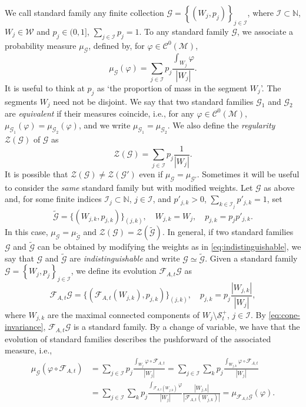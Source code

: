 \documentclass{amsart}
\numberwithin{equation}{section}
\newcommand\vf{\varphi}
\newcommand\cC{{\mathcal C}}
\newcommand\cF{{\mathcal F}}
\newcommand\cG{{\mathcal G}}
\newcommand\cI{{\mathcal I}}
\newcommand\cM{{\mathcal M}}
\newcommand\cS{{\mathcal S}}
\newcommand\cW{{\mathcal W}}
\newcommand\cZ{{\mathcal Z}}
\newcommand\bN{{\mathbb N}}
\newcommand{\catt}{\cF_{A,t}}
\begin{document}
We call standard family any finite collection \(\cG = \left\{(W_j, p_j)\right\}_{j \in \cI}\), where \(\cI \subset \bN\), \(W_j \in \cW\) and \(p_j \in (0,1]\), \(\sum_{j\in \cI}p_j = 1\). To any standard family \(\cG\), we associate a probability measure \(\mu_{\cG}\), defined by, for \(\vf \in \cC^0(\cM)\),
\[
    \mu_{\cG} (\vf) = \sum_{j \in \cI}p_j\frac{\int_{W_j}\vf}{|W_j|}.
\]
It is useful to think at \(p_j\) as `the proportion of mass in the segment \(W_j\)'. The segments \(W_j\) need not be disjoint. We say that two standard families \(\cG_1\) and \(\cG_2\) are \textit{equivalent} if their measures coincide, i.e., for any \(\vf \in \cC^0(\cM)\), \(\mu_{\cG_1}(\vf) = \mu_{\cG_2}(\vf)\), and we write \(\mu_{\cG_1} = \mu_{\cG_2}\). We also define the \textit{regularity} \(\cZ(\cG)\) of \(\cG\) as
\begin{equation}
  \cZ (\cG) = \sum_{j \in \cI}p_j \frac{1}{|W_j|}.
\end{equation} 
It is possible that \(\cZ(\cG) \neq \cZ(\cG')\) even if \(\mu_{\cG} = \mu_{\cG'}\). Sometimes it will be useful to consider the \textit{same} standard family but with modified weights. Let \(\cG\) as above and, for some finite indices \(\cI_j \subset \bN\), \(j \in \cI\), and \(p'_{j,k} >0\), \(\sum_{k \in \cI_j} p'_{j,k} = 1\), set
\begin{equation}\label{eq:indistinguishable}
\widetilde \cG = \{( W_{j,k}, p_{j,k})\}_{(j,k)}, \quad  W_{j,k} = W_j, \quad  p_{j,k} = p_j p'_{j,k}.
\end{equation}
In this case, \(\mu_{\cG} = \mu_{\widetilde \cG}\) and \(\cZ(\cG) = \cZ(\widetilde \cG)\). In general, if two standard families \(\cG\) and \(\widetilde \cG\) can be obtained by modifying the weights as in \eqref{eq:indistinguishable}, we say that \(\cG\) and \(\widetilde \cG\) are \textit{indistinguishable} and write \(\cG \simeq \widetilde \cG\). Given a standard family \(\cG = \left\{W_j, p_j\right\}_{j \in \cI}\), we define its evolution \(\catt \cG\) as 
\begin{equation}\label{eq:def-evolution-sf}
\catt \cG = \{(\catt (W_{j,k}), p_{j,k})\}_{(j,k)}, \quad p_{j,k} = p_j \frac{| W_{j,k}|}{| W_{j}|},
\end{equation}
where \(W_{j,k}\) are the maximal connected components of \(W_j \setminus \cS_t^{+}\), \(j \in \cI\). By \eqref{eq:cone-invariance}, \(\catt \cG\) is a standard family. By a change of variable, we have that the evolution of standard families describes the pushforward of the associated measure, i.e.,
\begin{equation}\label{eq:pushforward-cat}
\begin{split}
\mu_{\cG}\left(\vf \circ \catt \right)  &=  \sum_{j \in \cI}p_j\frac{\int_{W_j}\vf \circ \catt}{|W_j|} = \sum_{j \in \cI}\sum_{k} p_j\frac{\int_{W_{j,k}}\vf \circ \catt}{|W_j|}\\
& = \sum_{j \in \cI}\sum_{k} p_j \frac{\int_{\catt(W_{j,k})} \vf }{|W_j|}\frac{|W_{j,k}|}{|\catt(W_{j,k})|} = \mu_{\catt \cG}(\vf).
\end{split}
\end{equation}
\end{document}
